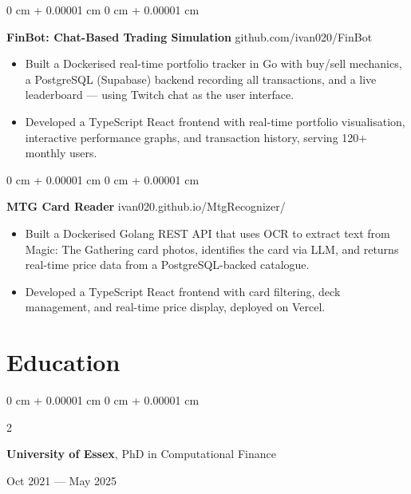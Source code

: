 \documentclass[6pt, letterpaper]{article}
\newenvironment{highlights}{
    \begin{itemize}[
        topsep=0.03 cm,
        parsep=0.03 cm,
        partopsep=0pt,
        itemsep=0pt,
        leftmargin=0 cm + 10pt
    ]
}{
    \end{itemize}
} %
\newenvironment{onecolentry}{
    \begin{adjustwidth}{
        0 cm + 0.00001 cm
    }{
        0 cm + 0.00001 cm
    }
}{
    \end{adjustwidth}
} %
\newenvironment{twocolentry}[2][]{
    \onecolentry
    \def\secondColumn{#2}
    \setcolumnwidth{\fill, 4.5 cm}
    \begin{paracol}{2}
}{
    \switchcolumn \raggedleft \secondColumn
    \end{paracol}
    \endonecolentry
} %
\begin{document}
    \begin{onecolentry}
        \textbf{FinBot: Chat-Based Trading Simulation} \hfill github.com/ivan020/FinBot

        \begin{highlights}

            \item Built a Dockerised real-time portfolio tracker in Go with buy/sell mechanics, a PostgreSQL (Supabase) backend recording all transactions, and a live leaderboard — using Twitch chat as the user interface.
            \item Developed a TypeScript React frontend with real-time portfolio visualisation, interactive performance graphs, and transaction history, serving 120+ monthly users.

        \end{highlights}
    \end{onecolentry}

    \begin{onecolentry}
        \textbf{MTG Card Reader} \hfill ivan020.github.io/MtgRecognizer/

        \begin{highlights}

            \item Built a Dockerised Golang REST API that uses OCR to extract text from Magic: The Gathering card photos, identifies the card via LLM, and returns real-time price data from a PostgreSQL-backed catalogue.
            \item Developed a TypeScript React frontend with card filtering, deck management, and real-time price display, deployed on Vercel.

        \end{highlights}
    \end{onecolentry}

    \section{Education}

            \begin{twocolentry}{
                Oct 2021 --- May 2025
            }
            \textbf{University of Essex}, PhD in Computational Finance
            \end{twocolentry}
\end{document}
